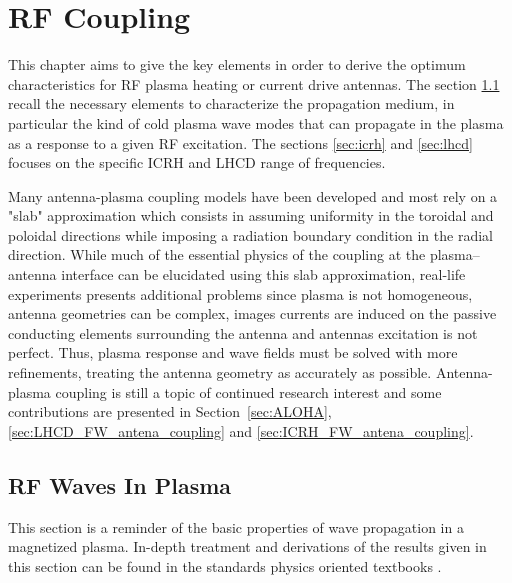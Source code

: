 \chapter{RF Coupling}
\label{chap:rf_coupling}
This chapter aims to give the key elements in order to derive the optimum characteristics for RF plasma heating or current drive antennas. The section \ref{sec:waves-in-plasma} recall the necessary elements to characterize the propagation medium, in particular the kind of cold plasma wave modes that can propagate in the plasma as a response to a given RF excitation. The sections \ref{sec:icrh} and \ref{sec:lhcd} focuses on the specific ICRH and LHCD range of frequencies. 

Many antenna-plasma coupling models have been developed and most rely on a "slab" approximation which consists in assuming uniformity in the toroidal and poloidal directions while imposing a radiation boundary condition in the radial direction. While much of the essential physics of the coupling at the plasma–antenna interface can be elucidated using this slab approximation, real-life experiments presents additional problems since plasma is not homogeneous, antenna geometries can be complex, images currents are induced on the passive conducting elements surrounding the antenna and antennas excitation is not perfect. Thus, plasma response and wave fields must be solved with more refinements, treating the antenna geometry as accurately as possible. Antenna-plasma coupling is still a topic of continued research interest and some contributions are presented in Section~\ref{sec:ALOHA}, \ref{sec:LHCD_FW_antena_coupling} and \ref{sec:ICRH_FW_antena_coupling}.


\section{RF Waves In Plasma}\label{sec:waves-in-plasma}
This section is a reminder of the basic properties of wave propagation in a magnetized plasma. In-depth treatment and derivations of the results given in this section can be found in the standards physics oriented textbooks . 

